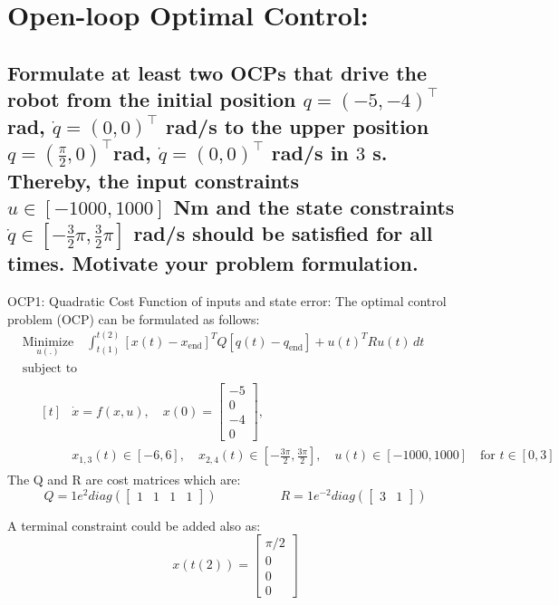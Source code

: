 \documentclass[a4paper, 12pt]{report}
\begin{document}
\section{Open-loop Optimal Control:}


\subsection{Formulate at least two OCPs that drive the robot from the initial position $ q = ({-5}, {-4})^\top $ rad, $\dot{q} = (0, 0)^\top$ rad/s to the upper position $q = (\frac{\pi}{2}, 0)^\top $rad, $\dot{q} = (0, 0)^\top$ rad/s in $3$ s. Thereby, the input constraints \( u \in [{-1000}, {1000}] \) Nm and the state constraints $\dot{q} \in [-\frac{3}{2}\pi, \frac{3}{2}\pi]$ rad/s should be satisfied for all times. Motivate your problem formulation.
}

OCP1: Quadratic Cost Function of inputs and state error:
The optimal control problem (OCP) can be formulated as follows:
\begin{align*}
&\underset{u(.)}{\text{Minimize}} \quad \int_{t(1)}^{t(2)} [x(t) - x_{\text{end}}]^T Q [q(t)-q_{\text{end}}] + u(t)^T R u(t) \, dt \\
&\text{subject to} \\
&\quad 
\begin{aligned}[t] 
&\dot{x} = f(x, u), \quad x(0) = \begin{bmatrix}-5 \\ 0 \\ -4 \\ 0\end{bmatrix}, \\
&x_{1,3}(t) \in [-6, 6], \quad x_{2,4}(t) \in \left[-\frac{3\pi}{2}, \frac{3\pi}{2}\right], \quad u(t) \in [-1000, 1000] \quad \text{for } t \in [0, 3]
\end{aligned}
\end{align*}
The Q and R are cost matrices which are:
$$Q=1e^2diag(\begin{bmatrix}1&1& 1& 1\end{bmatrix})  \quad\quad\quad\quad\quad R=1e^{-2}diag(\begin{bmatrix}3&1\end{bmatrix})$$

A terminal constraint could be added also as:
$$x(t(2))= \begin{bmatrix}\pi/2 \\ 0 \\ 0 \\ 0\end{bmatrix} $$
\end{document}
